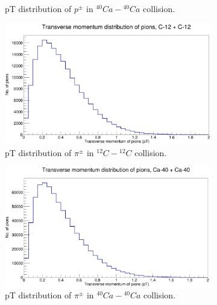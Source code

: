 \documentclass[12pt, twocolumn]{article}
\begin{document}
\begin{figure}[h]
\begin{subfigure}[h]{0.49\textwidth}
\caption{pT distribution of $p^{\pm}$ in $^{40}Ca-{^{40}Ca}$ collision.}
\label{Generator - Transverse momentum distribution of protons Ca40.}
\end{subfigure}
\par
\hfill
\begin{subfigure}[h]{0.49\textwidth}
\centering
\includegraphics[scale=0.14]{pT_Pions_C12.png}
\caption{pT distribution of $\pi^{\pm}$ in $^{12}C-{^{12}C}$ collision.}
\label{Generator - Transverse momentum distribution of pions C12.}
\end{subfigure}
\hfill
\vspace*{1cm}
\begin{subfigure}[h]{0.49\textwidth}
\centering
\includegraphics[scale=0.14]{pT_pions_Ca.png}
\caption{pT distribution of $\pi^{\pm}$ in $^{40}Ca-{^{40}Ca}$ collision.}
\label{Generator - Transverse momentum distribution of pions Ca40.}
\end{subfigure}
\par
\hfill
\begin{subfigure}[h]{0.49\textwidth}
\centering

\end{subfigure}
\end{figure}
\end{document}
